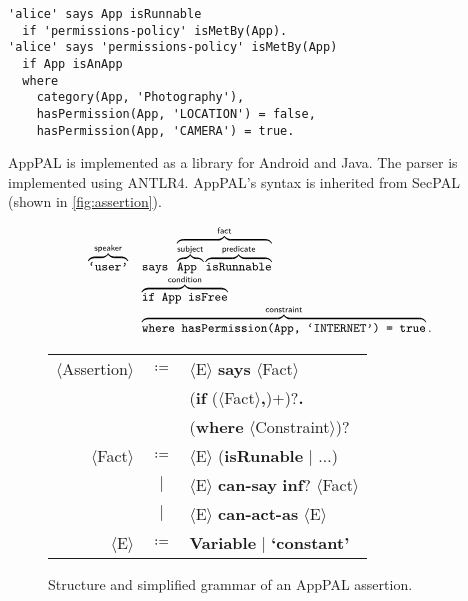 \documentclass[thesis.tex]{subfiles}
\begin{document}
\begin{lstlisting}
'alice' says App isRunnable
  if 'permissions-policy' isMetBy(App).
'alice' says 'permissions-policy' isMetBy(App)
  if App isAnApp
  where
    category(App, 'Photography'),
    hasPermission(App, 'LOCATION') = false,
    hasPermission(App, 'CAMERA') = true.
\end{lstlisting}

AppPAL is implemented as a library for Android and Java.
The parser is implemented using ANTLR4.
AppPAL's syntax is inherited from SecPAL~\cite{becker_secpal:_2010} (shown in \autoref{fig:assertion}).

\begin{figure}
  \newcommand{\bracetext}[1]{\text{\sffamily #1}}
  \newcommand{\smalltext}[1]{\text{\ttfamily\small #1}}
  \centering
  \begin{minipage}{0.49\linewidth}
    \begin{equation*}\small
      \begin{array}{r l}\footnotesize
        \overbrace{\smalltext{`user'}}^{\bracetext{speaker}} &
        \smalltext{ says }\overbrace{\overbrace{\smalltext{ App }}^{\bracetext{subject}}\overbrace{\smalltext{ isRunnable}}^{\bracetext{predicate}}}^{\bracetext{fact}} \\
        & \overbrace{\smalltext{ if App isFree}}^{\bracetext{condition}} \\
        & \overbrace{\smalltext{ where hasPermission(App, `INTERNET') = true}}^{\bracetext{constraint}}.
      \end{array}
    \end{equation*}
  \end{minipage}
  \begin{minipage}{0.49\linewidth}
  \newcommand{\nonterminal}[1]{$\langle$#1$\rangle$}
  \newcommand{\terminal}[1]{\textbf{#1}}
  \begin{tabular}{r c l}
    \footnotesize
    \nonterminal{Assertion} & $\coloneqq$ & \nonterminal{E} \terminal{says} \nonterminal{Fact} \\
                            &             & \hspace{1em}(\terminal{if} (\nonterminal{Fact}\terminal{,})+)?\terminal{.} \\
                            &             & \hspace{1em}(\terminal{where} \nonterminal{Constraint})? \\
    \nonterminal{Fact}      & $\coloneqq$ & \nonterminal{E} (\terminal{isRunable} $\vert$ $\ldots$) \\
                            & $\vert$     & \nonterminal{E} \terminal{can-say} \terminal{inf}? \nonterminal{Fact} \\
                            & $\vert$     & \nonterminal{E} \terminal{can-act-as} \nonterminal{E} \\
    \nonterminal{E}         & $\coloneqq$ & \terminal{Variable} $\vert$ \terminal{`constant'}
  \end{tabular}
  \vspace{2em}
  \end{minipage}
  \caption{Structure and simplified grammar of an AppPAL assertion.}
  \label{fig:assertion}
\end{figure}
\end{document}
